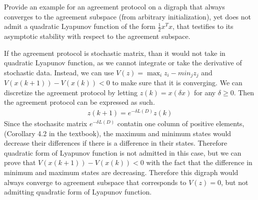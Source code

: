 \documentclass{article}
\begin{document}
\begin{problem}
    Provide an example for an agreement protocol on a digraph that always converges to the agreement subspace (from arbitrary initialization), yet does not admit a quadratic Lyapunov function of the form $\frac{1}{2} x^T x$, that testiﬁes to its asymptotic stability with respect to the agreement subspace.

    If the agreement protocol is stochastic matrix, than it would not take in quadratic Lyapunov function, as we cannot integrate or take the derivative of stochastic data. Instead, we can use $V(z) = \max_i z_i - min_j z_j$ and $V(x(k+1)) - V(x(k)) < 0 $ to make sure that it is converging. We can discretize the agreement protocol by letting $z(k) = x(\delta x)$ for any $\delta \geq 0$. Then the agreement protocol can be expressed as such. 
    \begin{align*}
        z(k+1) = e^{-\delta L(D)}z(k)
    \end{align*}
    Since the stochasitc matrix $e^{-\delta L(D)}$ contatin one column of positive elements, (Corollary 4.2 in the textbook), the maximum and minimum states would decrease their differences if there is a difference in their states. Therefore quadratic form of Lyapunov function is not admitted in this case, but we can prove that $V(x(k+1)) - V(x(k)) < 0$ with the fact that the difference in minimum and maximum states are decreasing. Therefore this digraph would always converge to agreement subspace that corresponds to $V (z)= 0$, but not admitting quadratic form of Lyapunov function.

\end{problem}
\end{document}
